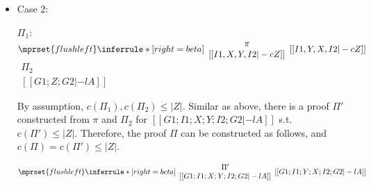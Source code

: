 \begin{itemize}
\item Case 2:
      \begin{center}
        \scriptsize
        $\Pi_1$:
        \begin{math}
          $$\mprset{flushleft}
          \inferrule* [right={\tiny beta}] {
            {
              \begin{array}{c}
                \pi \\
                {[[I1, X, Y, I2 |-c Z]]}
              \end{array}
            }
          }{[[I1, Y, X, I2 |-c Z]]}
        \end{math}
        \qquad\qquad
        \begin{math}
          \begin{array}{c}
            \Pi_2 \\
            {[[G1; Z; G2 |-l A]]}
          \end{array}
        \end{math}
      \end{center}
      By assumption, $c(\Pi_1),c(\Pi_2)\leq |Z|$. Similar as above, there
      is a proof $\Pi'$ constructed from $\pi$ and $\Pi_2$ for 
      $[[G1; I1; X; Y; I2; G2 |-l A]]$ s.t. $c(\Pi')\leq|Z|$. Therefore,
      the proof $\Pi$ can be constructed as follows, and
      $c(\Pi)=c(\Pi')\leq|Z|$.
      \begin{center}
        \scriptsize
        \begin{math}
          $$\mprset{flushleft}
          \inferrule* [right={\tiny beta}] {
            {
              \begin{array}{c}
                \Pi' \\
                {[[G1; I1; X; Y; I2; G2 |-l A]]}
              \end{array}
            }
          }{[[G1; I1; Y; X; I2; G2 |-l A]]}
        \end{math}
      \end{center}
\end{itemize}

